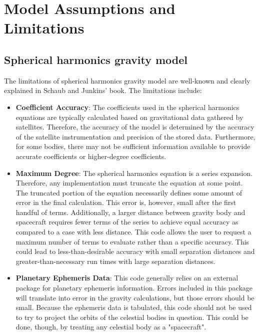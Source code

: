 \section{Model Assumptions and Limitations}
\subsection{Spherical harmonics gravity model}
The limitations of spherical harmonics gravity model are well-known and clearly explained in Schaub and Junkins' book\cite{schaub2014}. The limitations include:
\begin{itemize}
	\item \textbf{Coefficient Accuracy}: The coefficients used in the spherical harmonics equations are typically calculated based on gravitational data gathered by satellites. Therefore, the accuracy of the model is determined by the accuracy of the satellite instrumentation and precision of the stored data. Furthermore, for some bodies, there may not be sufficient information available to provide accurate coefficients or higher-degree coefficients.
	\item \textbf{Maximum Degree}: The spherical harmonics equation is a series expansion. Therefore, any implementation must truncate the equation at some point. The truncated portion of the equation necessarily defines some amount of error in the final calculation. This error is, however, small after the first handful of terms. Additionally, a larger distance between gravity body and spacecraft requires fewer terms of the series to achieve equal accuracy as compared to a case with less distance. This code allows the user to request a maximum number of terms to evaluate rather than a specific accuracy. This could lead to less-than-desirable accuracy with small separation distances and greater-than-necessary run times with large separation distances.
	\item \textbf{Planetary Ephemeris Data}: This code generally relies on an external package for planetary ephemeris information. Errors included in this package will translate into error in the gravity calculations, but those errors should be small. Because the ephemeris data is tabulated, this code should not be used to try to project the orbits of the celestial bodies in question. This could be done, though, by treating any celestial body as a "spacecraft".
\end{itemize}

